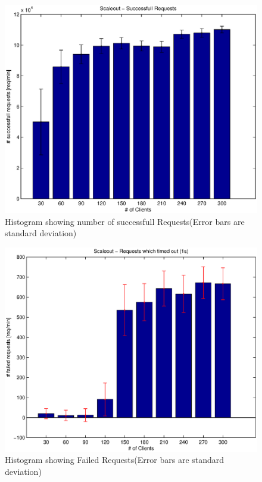 \documentclass[a4paper]{article}
\begin{document}
\begin{figure}[H]
	\begin{center}
    \includegraphics[scale=0.6]{../plots-ms2-mg/experiment-tp.eps}
  \end{center}
  \caption{Histogram showing number of successfull Requests\newline(Error bars are standard deviation)}
  \label{fig:experiment-tp}
\end{figure}



\begin{figure}[H]
	\begin{center}
    \includegraphics[scale=0.6]{../plots-ms2-mg/experiment-err.eps}
  \end{center}
  \caption{Histogram showing Failed Requests\newline(Error bars are standard deviation)}
  \label{fig:experiment-error}
\end{figure}
\end{document}
